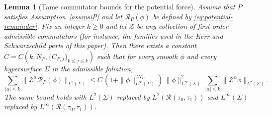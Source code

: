 \documentclass[10pt,a4paper]{amsart}
\newtheorem{lemma}{Lemma}
\begin{document}
\begin{lemma}[Tame commutator bounds for the potential force]\label{lem:potential-tame}
Assume that $P$ satisfies Assumption~\ref{asumsiP} and let $\mathcal R_{P}(\phi)$ be defined by \eqref{eq:potential-remainder}.
Fix an integer $k\ge 0$ and let $\mathcal Z$ be any collection of \emph{first-order} admissible commutators (for instance, the families used in the Kerr and Schwarzschild parts of this paper).
Then there exists a constant $C=C(k,N_{P},\{C_{P,j}\}_{0\le j\le k})$ such that for every smooth $\phi$ and every hypersurface $\Sigma$ in the admissible foliation,
\begin{equation}\label{eq:potential-tame-L2}
\sum_{|\alpha|\le k}\|\mathcal Z^{\alpha}\mathcal R_{P}(\phi)\|_{L^{2}(\Sigma)}
\le
C\,(1+\|\phi\|_{L^{\infty}(\Sigma)}^{2N_{P}})\,\|\phi\|_{L^{\infty}(\Sigma)}^{2}\,
\sum_{|\alpha|\le k}\|\mathcal Z^{\alpha}\phi\|_{L^{2}(\Sigma)}.
\end{equation}
The same bound holds with $L^{2}(\Sigma)$ replaced by $L^{2}(\mathcal R(\tau_{0},\tau_{1}))$ and $L^{\infty}(\Sigma)$ replaced by $L^{\infty}(\mathcal R(\tau_{0},\tau_{1}))$.
\end{lemma}
\end{document}
